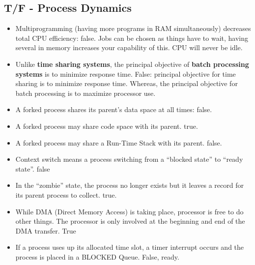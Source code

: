 \documentclass[fontsize=5pt]{scrartcl}
\begin{document}
\begin{multicols}{3}
    \subsection{T/F - Process Dynamics}
        \begin{itemize}
          \item Multiprogramming (having more programs in RAM simultaneously) decreases total CPU efficiency: false. Jobs can be chosen as things have to wait, having several
                in memory increases your capability of this. CPU will never be idle.
          \item Unlike \textbf{time sharing systems}, the principal objective of \textbf{batch processing systems} is to minimize response time. False: principal objective for time sharing is to 
                minimize response time. Whereas, the principal objective for batch processing is to maximize processor use.
          \item A forked process shares its parent's data space at all times: false.
          \item A forked process may share code space with its parent. true.
          \item A forked process may share a Run-Time Stack with its parent. false.
          \item Context switch means a process switching from a ``blocked state'' to ``ready state''. false
          \item In the ``zombie'' state, the process no longer exists but it leaves a record for its parent process to collect. true.
          \item While DMA (Direct Memory Access) is taking place, processor is free
                to do other things. The processor is only involved at the beginning
                and end of the DMA transfer. True
          \item If a process uses up its allocated time slot, a timer interrupt occurs
                and the process is placed in a BLOCKED Queue. False, ready.
          
                
          
        \end{itemize}
    

\end{multicols}
\end{document}
